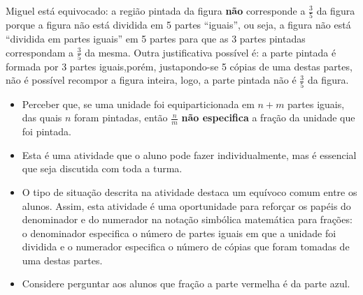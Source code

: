\begin{solucao}{}{}
Miguel está equivocado: a região pintada da figura   {\bf não}   corresponde a   $\frac{3}{5}$ da figura porque a figura não está dividida em 5 partes ``iguais'', ou seja, a figura não está ``dividida em partes iguais'' em 5 partes para que as 3 partes pintadas correspondam a   $\frac{3}{5}$ da mesma. Outra justificativa possível é: a parte pintada é formada por 3 partes iguais,porém,  justapondo-se 5 cópias de uma destas partes, não é possível recompor a figura inteira, logo, a parte pintada não é $\frac{3}{5}$ da figura.

\end{solucao}

\newpage
\begin{multicols}{2}
  
\begin{objetivos}[label=chap2-ativ17]{}{}
  \begin{itemize} %
    \item Perceber que, se uma unidade foi equiparticionada em $n + m$ partes iguais, das quais $n$ foram pintadas, então $\frac{n}{m}$ {\bf não especifica} a fração da unidade que foi pintada.
\end{itemize} %
\end{objetivos}

\begin{orientacoes}
\begin{itemize} %
    \item       Esta é uma atividade que o aluno pode fazer individualmente, mas é essencial que seja discutida com toda a turma.
    \item       O tipo de situação descrita na atividade destaca um equívoco comum entre os alunos. Assim, esta atividade é uma oportunidade para reforçar os papéis do denominador e do numerador na notação simbólica matemática para frações: o denominador especifica o número de partes iguais em que a unidade foi dividida e o numerador especifica o número de cópias que foram tomadas de uma destas partes.
      \item Considere perguntar aos alunos que fração a parte vermelha é da parte azul.

\end{itemize} %


\end{orientacoes}
\end{multicols}
